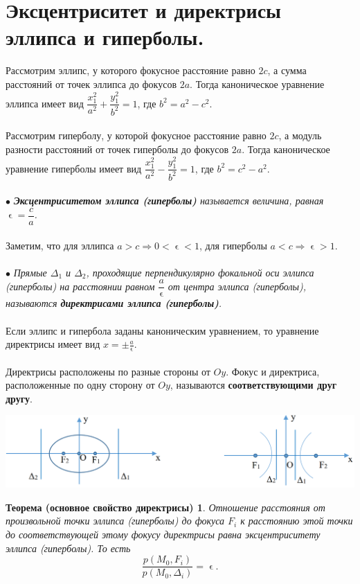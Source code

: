 \section{Эксцентриситет и директрисы эллипса и гиперболы.}
Рассмотрим эллипс, у которого фокусное расстояние равно $2c$, а сумма расстояний от точек эллипса до фокусов $2a$. Тогда каноническое уравнение эллипса имеет вид $\dfrac{x_1^2}{a^2} + \dfrac{y_1^2}{b^2} = 1$, где $b^2 = a^2 - c^2$.\\\\
Рассмотрим гиперболу, у которой фокусное расстояние равно $2c$, а модуль разности расстояний от
точек гиперболы до фокусов $2a$. Тогда каноническое уравнение гиперболы имеет вид $\dfrac{x_1^2}{a^2} - \dfrac{y_1^2}{b^2} = 1$, где $b^2 = c^2 - a^2$.\\\\
$\bullet$ \textit{\textbf{Эксцентриситетом эллипса (гиперболы)} называется величина, равная $\upvarepsilon = \dfrac{c}{a}$.}\\\\
Заметим, что для эллипса $a > c \Rightarrow 0 < \upvarepsilon < 1$, для гиперболы $a < c \Rightarrow \upvarepsilon > 1.$\\\\
$\bullet$ \textit{Прямые $\Delta_1$ и $\Delta_2$, проходящие перпендикулярно фокальной оси эллипса (гиперболы) на
	расстоянии равном $\dfrac{a}{\upvarepsilon}$ от центра эллипса (гиперболы), называются \textbf{директрисами эллипса (гиперболы)}.}\\\\
Если эллипс и гипербола заданы каноническим уравнением, то уравнение директрисы имеет вид $x = \pm \frac{a}{\upvarepsilon}$.\\\\
Директрисы расположены по разные стороны от $Oy$. Фокус и директриса, расположенные по одну
сторону от $Oy$, называются \textbf{соответствующими друг другу}.\\
\begin{center}
	\includegraphics[scale=0.5]{images/exc1.png}
\end{center}
\newtheorem*{t3_1}{Теорема (основное свойство директрисы)}
\begin{t3_1}
	Отношение расстояния от произвольной точки эллипса
	(гиперболы) до фокуса $F_i$ к расстоянию этой точки до соответствующей этому фокусу директрисы
	равна эксцентриситету эллипса (гиперболы). То есть $$\dfrac{p(M_0,F_i)}{p(M_0,\Delta_i)} = \upvarepsilon.$$
\end{t3_1}

